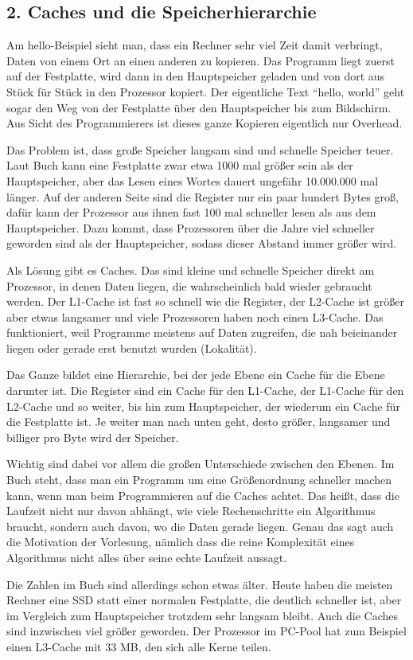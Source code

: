 \documentclass[11pt]{article}
\begin{document}
\subsection*{2. Caches und die Speicherhierarchie}

Am hello-Beispiel sieht man, dass ein Rechner sehr viel Zeit damit verbringt, Daten von einem Ort
an einen anderen zu kopieren. Das Programm liegt zuerst auf der Festplatte, wird dann in den
Hauptspeicher geladen und von dort aus Stück für Stück in den Prozessor kopiert. Der eigentliche
Text "`hello, world"' geht sogar den Weg von der Festplatte über den Hauptspeicher bis zum
Bildschirm. Aus Sicht des Programmierers ist dieses ganze Kopieren eigentlich nur Overhead.

Das Problem ist, dass große Speicher langsam sind und schnelle Speicher teuer. Laut Buch kann eine
Festplatte zwar etwa 1000 mal größer sein als der Hauptspeicher, aber das Lesen eines Wortes dauert
ungefähr 10.000.000 mal länger. Auf der anderen Seite sind die Register nur ein paar hundert Bytes
groß, dafür kann der Prozessor aus ihnen fast 100 mal schneller lesen als aus dem Hauptspeicher.
Dazu kommt, dass Prozessoren über die Jahre viel schneller geworden sind als der Hauptspeicher,
sodass dieser Abstand immer größer wird.

Als Lösung gibt es Caches. Das sind kleine und schnelle Speicher direkt am Prozessor, in denen
Daten liegen, die wahrscheinlich bald wieder gebraucht werden. Der L1-Cache ist fast so schnell wie
die Register, der L2-Cache ist größer aber etwas langsamer und viele Prozessoren haben noch einen
L3-Cache. Das funktioniert, weil Programme meistens auf Daten zugreifen, die nah beieinander liegen
oder gerade erst benutzt wurden (Lokalität).

Das Ganze bildet eine Hierarchie, bei der jede Ebene ein Cache für die
Ebene darunter ist. Die Register sind ein Cache für den L1-Cache, der L1-Cache für den L2-Cache und
so weiter, bis hin zum Hauptspeicher, der wiederum ein Cache für die Festplatte ist. Je weiter man
nach unten geht, desto größer, langsamer und billiger pro Byte wird der Speicher.

Wichtig sind dabei vor allem die großen Unterschiede zwischen den Ebenen. Im Buch steht,
dass man ein Programm um eine Größenordnung schneller machen kann, wenn man beim Programmieren auf
die Caches achtet. Das heißt, dass die Laufzeit nicht nur davon abhängt, wie viele Rechenschritte
ein Algorithmus braucht, sondern auch davon, wo die Daten gerade liegen. Genau das sagt auch die
Motivation der Vorlesung, nämlich dass die reine Komplexität eines Algorithmus nicht alles über
seine echte Laufzeit aussagt.

Die Zahlen im Buch sind allerdings schon etwas älter. Heute haben die meisten Rechner eine SSD
statt einer normalen Festplatte, die deutlich schneller ist, aber im Vergleich zum Hauptspeicher
trotzdem sehr langsam bleibt. Auch die Caches sind inzwischen viel größer geworden. Der Prozessor
im PC-Pool hat zum Beispiel einen L3-Cache mit 33 MB, den sich alle Kerne teilen.
\end{document}
